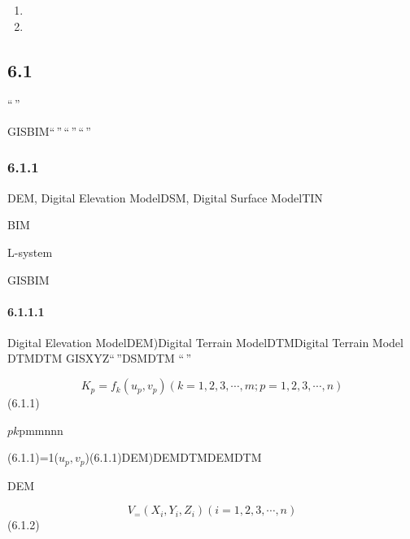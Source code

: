 \hypertarget{section-13}{%
\subsubsection{}\label{section-13}}

\begin{enumerate}
\def\labelenumi{\arabic{enumi}.}
\tightlist
\item
\item
\end{enumerate}

\hypertarget{section-14}{%
\subsection{}\label{section-14}}

\hypertarget{section-15}{%
\subsection{6.1}\label{section-15}}

``\,''

GISBIM``\,''\,``\,''\,``\,''

\hypertarget{section-16}{%
\subsubsection{6.1.1}\label{section-16}}

DEM, Digital Elevation ModelDSM, Digital Surface ModelTIN

BIM

L-system

GISBIM

\hypertarget{section-17}{%
\paragraph{6.1.1.1}\label{section-17}}

Digital Elevation ModelDEM)Digital Terrain ModelDTMDigital Terrain Model
DTMDTM GISXYZ``\,''DSMDTM ``\,''

\[
K_p = f_k(u_p,v_p)(k=1,2,3,\cdots,m;p=1,2,3,\cdots,n)
\] (6.1.1)

\(p\)\highlight{,}\(k\)p\highlight{}m\highlight{}mn\highlight{}n\highlight{}n

(6.1.1)=1(\(u_p,v_p\))(6.1.1)DEM)DEMDTMDEMDTM

DEM

\[
V_=(X_i,Y_i,Z_i)(i=1,2,3,\cdots,n)
\] (6.1.2)

